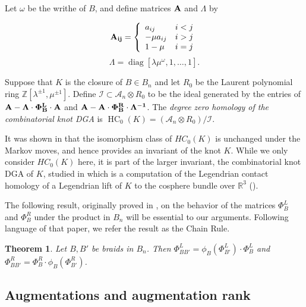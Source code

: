 \documentclass[11pt]{amsart}
\def\Z{{\mathbb Z}}
\def\R{{\mathbb R}}
\def\A{{\mathcal A}}
\newcommand\diag{\operatorname{diag}}
\newtheorem{thm}{Theorem}[section]
\newenvironment{definition}[1][Definition]{\begin{trivlist}
\item[\hskip \labelsep {\bfseries #1}]}{\end{trivlist}}
\begin{document}
  Let $\omega$ be the writhe of $B$, and define matrices $\bf{A}$ and $\Lambda$ by

  \begin{equation}
  \bf{A}_{ij} = 
  \left\{
       \begin{array}{lr}
        a_{ij} & i<j\\
        -\mu a_{ij} & i>j\\
        1-\mu & i = j\\
       \end{array}
  \right.
  \label{def:Amatrix}
  \end{equation}
  \begin{equation}
  \Lambda = \diag[\lambda\mu^\omega,1,\ldots,1].
  \label{defn:Lambda}
  \end{equation}

  \begin{definition}
  Suppose that $K$ is the closure of $B\in B_n$ and let $R_0$ be the Laurent polynomial ring $\Z[\lambda^{\pm 1},\mu^{\pm 1}]$. Define $\mathcal{I}\subset \A_n\otimes R_0$ to be the ideal generated by the entries of $\bf{A} - \Lambda\cdot\Phi_B^L\cdot \bf{A}$ and $\bf{A} - \bf{A}\cdot\Phi_B^R\cdot\Lambda^{-1}$.  The \emph{degree zero homology of the combinatorial knot DGA} is $\operatorname{HC}_0(K) = (\A_n\otimes R_0)/\mathcal{I}$.
  \label{defn:HC_0}
  \end{definition}
  It was shown in \cite{Ng08} that the isomorphism class of $HC_0(K)$ is unchanged under the Markov moves, and hence provides an invariant of the knot $K$. While we only consider $HC_0(K)$ here, it is part of the larger invariant, the combinatorial knot DGA of $K$, studied in \cite{Ng08} which is a computation of the Legendrian contact homology of a Legendrian lift of $K$ to the cosphere bundle over $\R^3$ (\cite{EENS12}).

  The following result, originally proved in \cite{Ng05}, on the behavior of the matrices $\Phi_B^L$ and $\Phi_B^R$ under the product in $B_n$ will be essential to our arguments. Following language of that paper, we refer the result as the Chain Rule.

  \begin{thm} Let $B,B'$ be braids in $B_n$. Then $\Phi_{BB'}^L = \phi_B(\Phi_{B'}^L)\cdot\Phi_B^L$ and $\Phi_{BB'}^R = \Phi_B^R\cdot\phi_B(\Phi_{B'}^R)$.
  \label{thm:ChainRule}
  \end{thm}


\subsection{Augmentations and augmentation rank}
\label{SecBG_AugRk}
\end{document}

